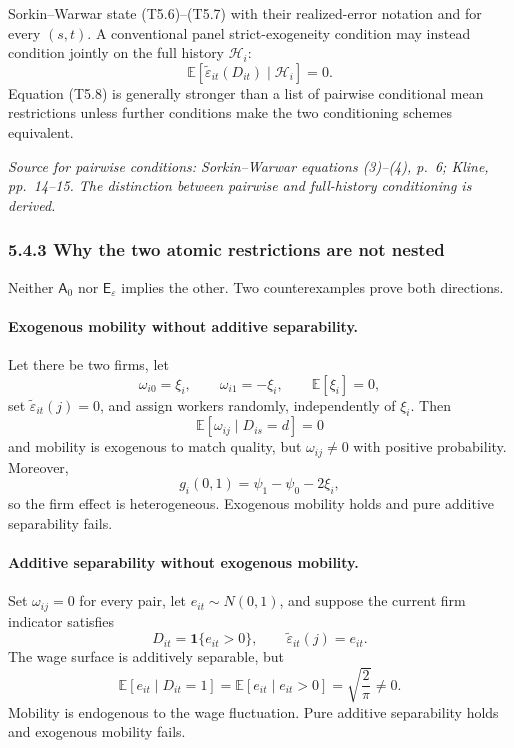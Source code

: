 \documentclass[11pt]{article}
\begin{document}
Sorkin--Warwar state (T5.6)--(T5.7) with their realized-error notation and
for every \((s,t)\).  A conventional panel strict-exogeneity condition may
instead condition jointly on the full history \(\mathcal H_i\):
\[
\mathbb E[
\widetilde\varepsilon_{it}(D_{it})
\mid
\mathcal H_i
]
=0.
\tag{T5.8}
\]
Equation (T5.8) is generally stronger than a list of pairwise conditional
mean restrictions unless further conditions make the two conditioning
schemes equivalent.

\textit{Source for pairwise conditions: Sorkin--Warwar equations (3)--(4),
p.\ 6; Kline, pp.\ 14--15.  The distinction between pairwise and full-history
conditioning is derived.}

\subsubsection{5.4.3 Why the two atomic restrictions are not nested}

Neither \(\mathsf A_0\) nor \(\mathsf E_\varepsilon\) implies the other.
Two counterexamples prove both directions.

\paragraph{Exogenous mobility without additive separability.}
Let there be two firms, let
\[
\omega_{i0}=\xi_i,
\qquad
\omega_{i1}=-\xi_i,
\qquad
\mathbb E[\xi_i]=0,
\tag{T5.9}
\]
set \(\widetilde\varepsilon_{it}(j)=0\), and assign workers randomly,
independently of \(\xi_i\).  Then
\[
\mathbb E[\omega_{ij}\mid D_{is}=d]=0
\tag{T5.10}
\]
and mobility is exogenous to match quality, but
\(\omega_{ij}\neq0\) with positive probability.  Moreover,
\[
g_i(0,1)=\psi_1-\psi_0-2\xi_i,
\tag{T5.11}
\]
so the firm effect is heterogeneous.  Exogenous mobility holds and pure
additive separability fails.

\paragraph{Additive separability without exogenous mobility.}
Set \(\omega_{ij}=0\) for every pair, let \(e_{it}\sim N(0,1)\), and suppose
the current firm indicator satisfies
\[
D_{it}=\mathbf 1\{e_{it}>0\},
\qquad
\widetilde\varepsilon_{it}(j)=e_{it}.
\tag{T5.12}
\]
The wage surface is additively separable, but
\[
\mathbb E[e_{it}\mid D_{it}=1]
=
\mathbb E[e_{it}\mid e_{it}>0]
=
\sqrt{\frac{2}{\pi}}
\neq0.
\tag{T5.13}
\]
Mobility is endogenous to the wage fluctuation.  Pure additive separability
holds and exogenous mobility fails.
\end{document}
